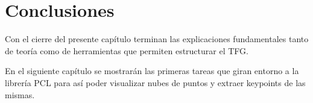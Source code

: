 \section{Conclusiones}
Con el cierre del presente capítulo terminan las explicaciones fundamentales tanto de teoría como de herramientas que permiten estructurar el TFG.

En el siguiente capítulo se mostrarán las primeras tareas que giran entorno a la librería PCL para así poder visualizar nubes de puntos y extraer keypoints de las mismas.

